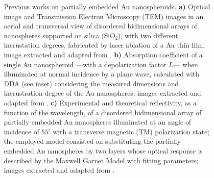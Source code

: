 \begin{figure}[h!]
\centering
\hspace*{-3.75em}%
  \vspace*{-.75em}
  \caption[Backgrounds]{Previous works on partially embedded Au nanospheroids. \textbf{a)} Optical image and Transmission Electron Microscopy (TEM) images in an aerial and transversal view of disordered bidimensional arrays of nanospheres supported on silica  (SiO$_2$),  with two different incrustation degrees, fabricated by laser ablation of a Au thin film; image extracted and adapted from \cite{meng_anisotropic_2015}. \textbf{b) }  Absorption coefficient of a single Au nanospheroid ---with a depolarization factor $L$--- when illuminated at normal incidence by a plane wave, calculated with DDA (see inset) considering the measured dimensions and incrustration degree of the Au nanospheres; images extracted and adapted from \cite{meng_anisotropic_2015}.  \textbf{c)} Experimental and theoretical reflectivity, as a function of the wavelength, of a disordered bidimensional array of partially embedded Au nanospheres illuminated at an angle of incidence of $55^\circ$ with a transverse magnetic (TM) polarization state; the employed model consisted on substituting the partially embedded Au nanospheres by two layers whose optical response is described by the Maxwell Garnet Model with fitting parameters; images extracted and adapted from \cite{moirangthem_enhanced_2012}.
   }
\label{fig:IncPapers}
\end{figure}

